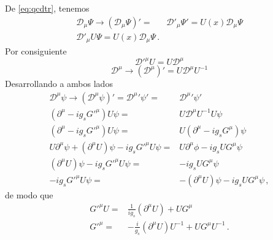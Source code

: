 De \eqref{eq:qcdtr}, tenemos
\begin{align}
   \mathcal{D}_\mu\Psi\to \left(\mathcal{D}_\mu\Psi\right)'=&\mathcal{D}'_\mu\Psi'
  =U(x)\mathcal{D}_\mu\Psi\nonumber\\
\mathcal{D}'_\mu U\Psi
  =U(x)\mathcal{D}_\mu\Psi\,.
\end{align}
Por consiguiente
\begin{equation}
  {\mathcal{D}'}^\mu U=U\mathcal{D}^\mu
\end{equation}
\begin{equation}
  \mathcal{D}^\mu\to\left(
    \mathcal{D}^\mu
  \right)'=U\mathcal{D}^\mu U^{-1}
\end{equation}
Desarrollando a ambos lados
\begin{align}
  \label{eq:251qft}
   {\mathcal{D}}^\mu\psi\to{\left({\mathcal{D}}^\mu\psi\right)}'=
  {\mathcal{D}^\mu}'\psi'=&{\mathcal{D}^\mu}'\psi'\nonumber\\
  (\partial^\mu-i g_s {G'}^\mu) U\psi=&U\mathcal{D}^\mu U^{-1}U\psi\nonumber\\
  (\partial^\mu-i g_s {G'}^\mu) U\psi=&U(\partial^\mu-i g_s {G}^\mu)\psi\nonumber\\
  U\partial^\mu\psi+(\partial^\mu U)\psi-i g_s {G'}^\mu U \psi=&U\partial^\mu\phi-i g_s U {G}^\mu \psi\nonumber\\
  (\partial^\mu U)\psi-i g_s {G'}^\mu U \psi=&-i g_s U {G}^\mu \psi\nonumber\\
  -i g_s {G'}^\mu U \psi=&-(\partial^\mu U)\psi-i g_s U {G}^\mu \psi\,,
\end{align}
de modo que
\begin{align}
     {G'}^\mu U =&\frac{1}{i g_s}(\partial^\mu U)+ U{G}^\mu \nonumber\\
   {G'}^\mu  =&-\frac{i}{g_s}(\partial^\mu U)U^{-1}+ U{G}^\mu U^{-1}\,.
\end{align}
